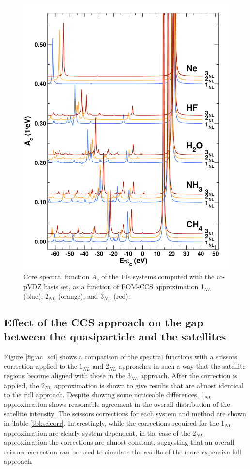 \documentclass[aps,prb,preprint,groupaddress,floatfix]{revtex4}
\begin{document}
\begin{figure}[t]
\includegraphics[scale=0.40,clip]{Fig05-SI.pdf}
\caption{\label{fig:acbas2}
Core spectral function $A_c$ of the $10e$ systems computed with the cc-pVDZ basis set, as a function of EOM-CCS approximation 1$_{NL}$ (blue), 2$_{NL}$ (orange), and 3$_{NL}$ (red).
}
\end{figure}

\subsection{Effect of the CCS approach on the gap between the quasiparticle and the satellites}

Figure \ref{fig:ac_sci} shows a comparison of the spectral functions with a scissors correction applied to the 1$_{NL}$ and 2$_{NL}$ approaches in such a way that the satellite regions become aligned with those in the 3$_{NL}$ approach. After the correction is applied, the 2$_{NL}$ approximation is shown to give results that are almost identical to the full approach. Despite showing some noticeable differences, 1$_{NL}$ approximation shows reasonable agreement in the overall distribution of the satellite intensity. The scissors corrections for each system and method are shown in Table \ref{tbl:scicorr}. Interestingly, while the corrections required for the 1$_{NL}$ approximation are clearly system-dependent, in the case of the 2$_{NL}$ approximation the corrections are almost constant, suggesting that an overall scissors correction can be used to simulate the results of the more expensive full approach.
\end{document}
